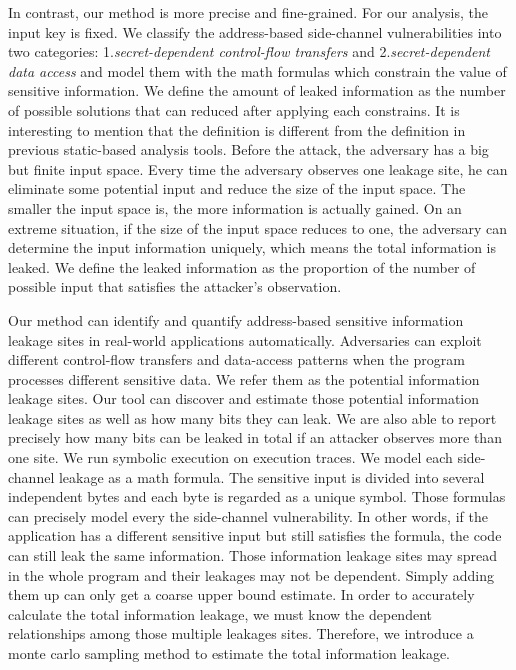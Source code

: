 In contrast, our method is more precise and fine-grained. 
For our analysis, the input key is fixed. We classify the address-based side-channel 
vulnerabilities into two categories: 1.\textit{secret-dependent control-flow transfers} 
and 2.\textit{secret-dependent data access} and model them with the math formulas which
constrain the value of sensitive information.
We define the amount of leaked information as the number of possible solutions that can
reduced after applying each constrains.
It is interesting to mention that the definition is different from the 
definition in previous static-based analysis tools. 
Before the attack, the adversary has a big but finite input space.
Every time the adversary observes one leakage site, he can eliminate some potential input and
reduce the size of the input space. The smaller the input space is, the more information is 
actually gained. On an extreme situation, if the size of the input space reduces to one, the
adversary can determine the input information uniquely, which means the total information is 
leaked. We define the leaked information as the proportion of the number of possible input 
that satisfies the attacker's observation.

Our method can identify and quantify address-based
sensitive information leakage sites in real-world applications automatically. 
Adversaries can exploit different control-flow transfers and data-access patterns when 
the program processes different sensitive data. We refer them as the potential information
leakage sites. Our tool can discover and estimate those potential information leakage sites 
as well as how many bits they can leak. We are also able to report precisely how many bits
can be leaked in total if an attacker observes more than one site.
We run symbolic execution on execution traces. We model each side-channel leakage as a math formula. 
The sensitive input is divided into several independent bytes and each byte is regarded as 
a unique symbol. Those formulas can precisely model every the side-channel vulnerability. 
In other words, if the application has a different sensitive input but still satisfies the formula, 
the code can still leak the same information.  
Those information leakage sites may spread in the whole program 
and their leakages may not be dependent. Simply adding them up can only get a coarse upper bound 
estimate. In order to accurately calculate the total information leakage, we must know the 
dependent relationships among those multiple leakages sites. Therefore, we introduce a 
monte carlo sampling method to estimate the total information leakage.

